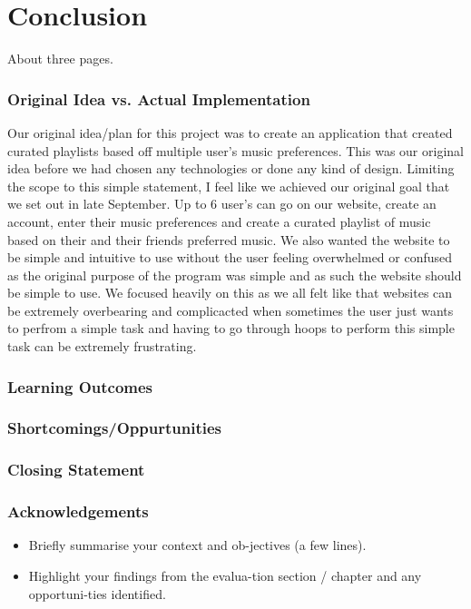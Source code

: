 \chapter{Conclusion}
About three pages.

\subsection{Original Idea vs. Actual Implementation}
Our original idea/plan for this project was to create an application that created curated playlists based off multiple user's music preferences. This was our original idea before we had chosen any technologies or done any kind of design. Limiting the scope to this simple statement, I feel like we achieved our original goal that we set out in late September.
Up to 6 user's can go on our website, create an account, enter their music preferences and create a curated playlist of music based on their and their friends preferred music. We also wanted the website to be simple and intuitive to use without the user feeling overwhelmed or confused as the original purpose of the program was simple and as such the website should be simple to use.
We focused heavily on this as we all felt like that websites can be extremely overbearing and complicacted when sometimes the user just wants to perfrom a simple task and having to go through hoops to perform this simple task can be extremely frustrating.

\subsection{Learning Outcomes}
\subsection{Shortcomings/Oppurtunities}
\subsection{Closing Statement}
\subsection{Acknowledgements}

\begin{itemize}
\item Briefly summarise your context and ob-jectives (a few lines).
\item Highlight your findings from the evalua-tion section / chapter and any opportuni-ties identified.
\end{itemize}

